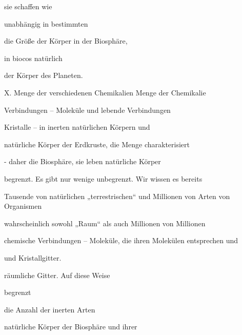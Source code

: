 \documentclass[11pt,a4paper]{book}
\begin{document}
                                   sie schaffen wie



                                   unabhängig in bestimmten



                                   die Größe der Körper in der Biosphäre,



                                   in biocos natürlich



                                   der Körper des Planeten.



 



X. Menge der verschiedenen Chemikalien Menge der Chemikalie



Verbindungen -- Moleküle und lebende Verbindungen



Kristalle -- in inerten natürlichen Körpern und



natürliche Körper der Erdkruste, die Menge charakterisiert



- daher die Biosphäre, sie leben natürliche Körper



begrenzt. Es gibt nur wenige unbegrenzt. Wir wissen es bereits



Tausende von natürlichen „terrestrischen“ und Millionen von Arten von Organismen



wahrscheinlich sowohl „Raum“ als auch Millionen von Millionen



chemische Verbindungen -- Moleküle, die ihren Molekülen entsprechen und



und Kristallgitter.



räumliche Gitter. Auf diese Weise



begrenzt



die Anzahl der inerten Arten



natürliche Körper der Biosphäre und ihrer
\end{document}
